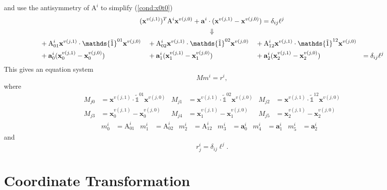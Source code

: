 \documentclass{scrartcl}
\begin{document}
and use the antisymmetry of $\mathrm A^i$ to simplify (\ref{cond:x0t0})
\begin{gather}
  (\mathbf x^{v(j,1)})^T\mathrm A^i\mathbf x^{v(j,0)}
  +\mathbf a^i\cdot(\mathbf x^{v(j,1)}-\mathbf x^{v(j,0)})
  =\delta_{ij}\ell^j \\
  \Downarrow \notag\\
  \begin{aligned}
  &+\mathrm A^i_{01}\mathbf x^{v(j,1)}\cdot\mathds{\tilde1}^{01}\mathbf x^{v(j,0)}&
  &+\mathrm A^i_{02}\mathbf x^{v(j,1)}\cdot\mathds{\tilde1}^{02}\mathbf x^{v(j,0)}&
  &+\mathrm A^i_{12}\mathbf x^{v(j,1)}\cdot\mathds{\tilde1}^{12}\mathbf x^{v(j,0)}\\
  &+\mathbf a^i_0(\mathbf x^{v(j,1)}_0-\mathbf x^{v(j,0)}_0)&
  &+\mathbf a^i_1(\mathbf x^{v(j,1)}_1-\mathbf x^{v(j,0)}_1)&
  &+\mathbf a^i_2(\mathbf x^{v(j,1)}_2-\mathbf x^{v(j,0)}_2)&
  =\delta_{ij}\ell^j
  \end{aligned}
\end{gather}
This gives an equation system
\begin{equation}
  Mm^i=r^i,
\end{equation}
where
\begin{equation}
  \begin{aligned}
  M_{j0}&=\mathbf x^{v(j,1)}\cdot\mathds{\tilde1}^{01}\mathbf x^{v(j,0)}&
  M_{j1}&=\mathbf x^{v(j,1)}\cdot\mathds{\tilde1}^{02}\mathbf x^{v(j,0)}&
  M_{j2}&=\mathbf x^{v(j,1)}\cdot\mathds{\tilde1}^{12}\mathbf x^{v(j,0)}\\
  M_{j3}&=\mathbf x^{v(j,1)}_0-\mathbf x^{v(j,0)}_0&
  M_{j4}&=\mathbf x^{v(j,1)}_1-\mathbf x^{v(j,0)}_1&
  M_{j5}&=\mathbf x^{v(j,1)}_2-\mathbf x^{v(j,0)}_2
  \end{aligned}
\end{equation}
\begin{align}
  m^i_0&=\mathrm A^i_{01}&
  m^i_1&=\mathrm A^i_{02}&
  m^i_2&=\mathrm A^i_{12}&
  m^i_3&=\mathbf a^i_0&
  m^i_4&=\mathbf a^i_1&
  m^i_5&=\mathbf a^i_2&
\end{align}
and
\begin{equation}
  r^i_j=\delta_{ij}\ell^j.
\end{equation}

\section{Coordinate Transformation}
\end{document}
